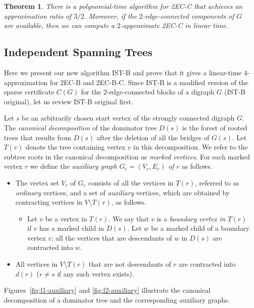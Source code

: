 \documentclass[11pt]{article}
\newtheorem{theorem}{Theorem}[section]
\begin{document}
\begin{theorem}
\label{theorem:2EC-C}
There is a polynomial-time algorithm for \textsf{2EC-C} that achieves an approximation ratio of $3/2$. Moreover, if the $2$-edge-connected components of $G$ are available, then we can compute a $2$-approximate \textsf{2EC-C} in linear time.
\end{theorem}


\subsection{Independent Spanning Trees}
\label{section:IST}

Here we present our new algorithm \textsf{IST-B} and prove that it
gives a linear-time $4$-approximation for \textsf{2EC-B} and
\textsf{2EC-B-C}. Since \textsf{IST-B} is a modified version of
the sparse certificate $C(G)$ for the $2$-edge-connected blocks of
a digraph $G$ \cite{2ECB} (\textsf{IST-B original}), let us review
\textsf{IST-B original} first.


Let $s$ be an arbitrarily chosen start vertex of the strongly connected digraph $G$.
The \emph{canonical decomposition} of the dominator tree $D(s)$ is the forest of rooted trees that results from $D(s)$ after the deletion of all the bridges of $G(s)$.
Let $T(v)$ denote the tree containing vertex $v$ in this decomposition. We refer to the subtree roots in the canonical decomposition as \emph{marked vertices}.
For each marked vertex $r$ we define the \emph{auxiliary graph $G_r = (V_r, E_r)$ of $r$} as follows.
\begin{itemize}
\item The vertex set $V_r$ of $G_r$ consists of all the vertices in $T(r)$, referred to as \emph{ordinary} vertices, and a set of
\emph{auxiliary} vertices, which are obtained by contracting vertices in $V\setminus T(r)$, as follows.
\begin{itemize}
\item Let $v$ be a vertex in $T(r)$.
We say that $v$ is a \emph{boundary vertex in} $T(r)$ if $v$ has a marked child in $D(s)$.
Let $w$ be a marked child of a boundary vertex $v$:
all the vertices that are descendants of  $w$ in $D(s)$  are contracted into $w$.
\end{itemize}
\item All vertices in $V \setminus T(r)$ that are not descendants of $r$ are contracted into $d(r)$ ($r \not= s$ if any such vertex exists).
\end{itemize}
Figures~\ref{fig:l1-auxiliary} and \ref{fig:l2-auxiliary} illustrate the canonical decomposition of a dominator tree and the corresponding auxiliary graphs. 
\end{document}
